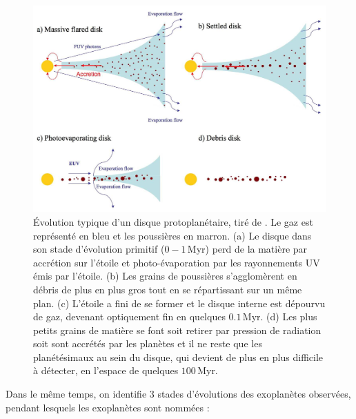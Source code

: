 \begin{figure}[ht!]
    \centering
    \includegraphics[width=\figwidth]{Figure_Chap1/Williams2011_Fig06_PlanetaryDiskEvolution.png}
    \caption[Évolution typique d'un disque protoplanétaire.]{Évolution typique d'un disque protoplanétaire, tiré de \cite{williams2011}. Le gaz est représenté en bleu et les poussières en marron. (a) Le disque dans son stade d'évolution primitif ($0-1\,$Myr) perd de la matière par accrétion sur l'étoile et photo-évaporation par les rayonnements \ac{UV} émis par l'étoile. (b) Les grains de poussières s'agglomèrent en débris de plus en plus gros tout en se répartissant sur un même plan. (c) L'étoile a fini de se former et le disque interne est dépourvu de gaz, devenant optiquement fin en quelques $0.1 \,$Myr. (d) Les plus petits grains de matière se font soit retirer par pression de radiation soit sont accrétés par les planètes et il ne reste que les planétésimaux au sein du disque, qui devient de plus en plus difficile à détecter, en l'espace de quelques $100 \,$Myr.}
    \label{fig:DiskEvo}
\end{figure}

Dans le même temps, on identifie $3$ stades d'évolutions des exoplanètes observées, pendant lesquels les exoplanètes sont nommées :

